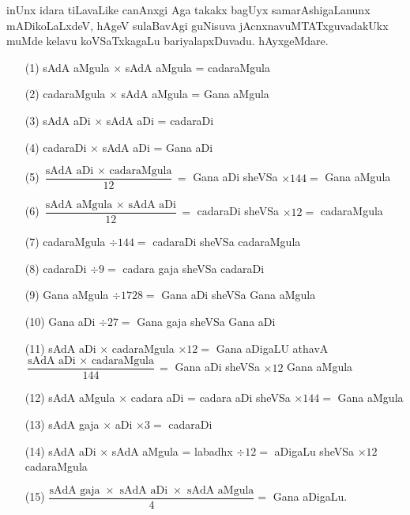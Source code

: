 inUnx idara tiLavaLike canAnxgi Aga takakx bagUyx samarAshigaLanunx
mADikoLaLxdeV, hAgeV sulaBavAgi guNisuva jAcnxnavuMTATxguvadakUkx
muMde kelavu koVSaTxkagaLu bariyalapxDuvadu. hAyxgeMdare.
\begin{itemize}
\item[\rm(1)] sAdA aMgula $\times$ sAdA aMgula = cadaraMgula

\item[\rm(2)] cadaraMgula $\times$ sAdA aMgula = Gana aMgula

\item[\rm(3)] sAdA aDi $\times$ sAdA aDi = cadaraDi

\item[\rm(4)] cadaraDi $\times$ sAdA aDi = Gana aDi

\item[\rm(5)] $\dfrac{\text{sAdA aDi $\times$ cadaraMgula}}{12}=$ Gana
  aDi sheVSa $\times 144 =$ Gana aMgula 

\item[\rm(6)] $\dfrac{\text{sAdA aMgula $\times$ sAdA aDi}}{12}=$
  cadaraDi sheVSa $\times 12=$ cadaraMgula

\item[\rm(7)] cadaraMgula $\div 144=$ cadaraDi sheVSa cadaraMgula

\item[\rm(8)] cadaraDi $\div 9=$ cadara gaja sheVSa cadaraDi

\item[\rm(9)] Gana aMgula $\div 1728=$ Gana aDi sheVSa Gana aMgula

\item[\rm(10)] Gana aDi $\div 27=$ Gana gaja sheVSa Gana aDi

\item[\rm(11)] sAdA aDi $\times$ cadaraMgula $\times 12=$ Gana aDigaLU
  athavA $\dfrac{\text{sAdA aDi $\times$ cadaraMgula}}{144}=$ Gana aDi
  sheVSa $\times 12$ Gana aMgula

\item[\rm(12)] sAdA aMgula $\times$ cadara aDi =  cadara aDi sheVSa
  $\times 144=$ Gana aMgula

\item[\rm(13)] sAdA gaja $\times$ aDi $\times 3=$ cadaraDi

\item[\rm(14)] sAdA aDi $\times$ sAdA aMgula = labadhx $\div 12=$
  aDigaLu sheVSa $\times 12$ cadaraMgula

\item[\rm(15)] $\dfrac{\text{sAdA gaja $\times$ sAdA aDi $\times$ sAdA
    aMgula}}{4}=$ Gana aDigaLu.
\end{itemize}

